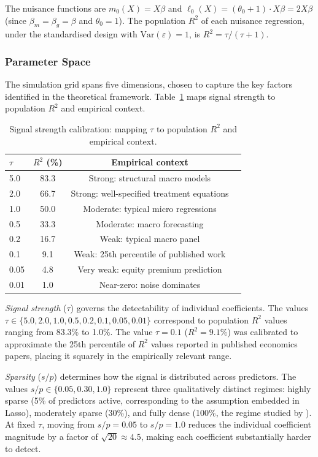 \documentclass[a4paper,10.5pt]{article}
\begin{document}
The nuisance functions are $m_0(X) = X\beta$ and $\ell_0(X) = (\theta_0 + 1) \cdot X\beta = 2X\beta$ (since $\beta_m = \beta_g = \beta$ and $\theta_0 = 1$). The population $R^2$ of each nuisance regression, under the standardised design with $\text{Var}(\varepsilon) = 1$, is $R^2 = \tau / (\tau + 1)$.


\subsubsection*{Parameter Space}

The simulation grid spans five dimensions, chosen to capture the key factors identified in the theoretical framework. Table~\ref{tab:calibration} maps signal strength to population $R^2$ and empirical context.

\begin{table}[H]
\centering
\small
\caption{Signal strength calibration: mapping $\tau$ to population $R^2$ and empirical context.}
\label{tab:calibration}
\begin{tabular}{lccl}
\toprule
$\tau$ & $R^2$ (\%) & Empirical context \\
\midrule
5.0  & 83.3 & Strong: structural macro models \\
2.0  & 66.7 & Strong: well-specified treatment equations \\
1.0  & 50.0 & Moderate: typical micro regressions \\
0.5  & 33.3 & Moderate: macro forecasting \\
0.2  & 16.7 & Weak: typical macro panel \\
0.1  & 9.1  & Weak: 25th percentile of published work \\
0.05 & 4.8  & Very weak: equity premium prediction \\
0.01 & 1.0  & Near-zero: noise dominates \\
\bottomrule
\end{tabular}
\end{table}

\textit{Signal strength} ($\tau$) governs the detectability of individual coefficients. The values $\tau \in \{5.0, 2.0, 1.0, 0.5, 0.2, 0.1, 0.05, 0.01\}$ correspond to population $R^2$ values ranging from 83.3\% to 1.0\%. The value $\tau = 0.1$ ($R^2 = 9.1\%$) was calibrated to approximate the 25th percentile of $R^2$ values reported in published economics papers, placing it squarely in the empirically relevant range.

\textit{Sparsity} ($s/p$) determines how the signal is distributed across predictors. The values $s/p \in \{0.05, 0.30, 1.0\}$ represent three qualitatively distinct regimes: highly sparse (5\% of predictors active, corresponding to the assumption embedded in Lasso), moderately sparse (30\%), and fully dense (100\%, the regime studied by \citealt{shenxiu2025}). At fixed $\tau$, moving from $s/p = 0.05$ to $s/p = 1.0$ reduces the individual coefficient magnitude by a factor of $\sqrt{20} \approx 4.5$, making each coefficient substantially harder to detect.
\end{document}

